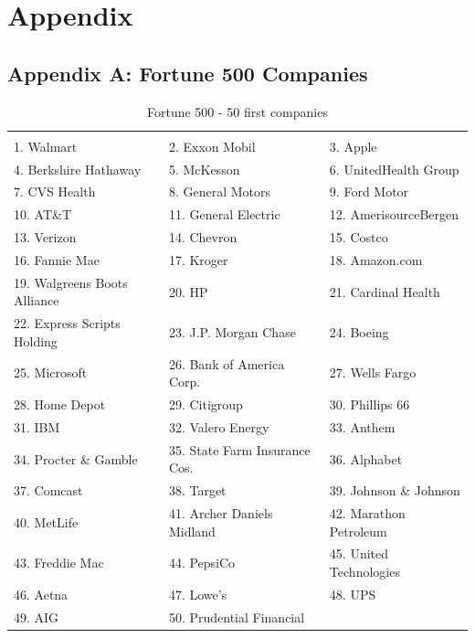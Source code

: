 \documentclass{article}
\begin{document}
\section{Appendix}
\subsection{Appendix A: Fortune 500 Companies} \label{appA}
\begin{table}[H]
\centering
\caption{Fortune 500 - 50 first companies}
\begin{tabular}{lll}
\hline
 \\ 1. Walmart 
&  2. Exxon Mobil 
&  3. Apple 
\\ 4. Berkshire Hathaway 
&  5. McKesson 
&  6. UnitedHealth Group 
\\ 7. CVS Health 
&  8. General Motors 
&  9. Ford Motor 
\\ 10. AT\&T 
&  11. General Electric 
&  12. AmerisourceBergen 
\\ 13. Verizon 
&  14. Chevron 
&  15. Costco 
\\ 16. Fannie Mae 
&  17. Kroger 
&  18. Amazon.com 
\\ 19. Walgreens Boots Alliance 
&  20. HP 
&  21. Cardinal Health 
\\ 22. Express Scripts Holding 
&  23. J.P. Morgan Chase 
&  24. Boeing 
\\ 25. Microsoft 
&  26. Bank of America Corp. 
&  27. Wells Fargo 
\\ 28. Home Depot 
&  29. Citigroup 
&  30. Phillips 66 
\\ 31. IBM 
&  32. Valero Energy 
&  33. Anthem 
\\ 34. Procter \& Gamble 
&  35. State Farm Insurance Cos. 
&  36. Alphabet 
\\ 37. Comcast 
&  38. Target 
&  39. Johnson \& Johnson 
\\ 40. MetLife 
&  41. Archer Daniels Midland 
&  42. Marathon Petroleum 
\\ 43. Freddie Mac 
&  44. PepsiCo 
&  45. United Technologies 
\\ 46. Aetna 
&  47. Lowe's 
&  48. UPS 
\\ 49. AIG 
&  50. Prudential Financial 
&
 \\ \hline
 \end{tabular}
\end{table}
\end{document}
